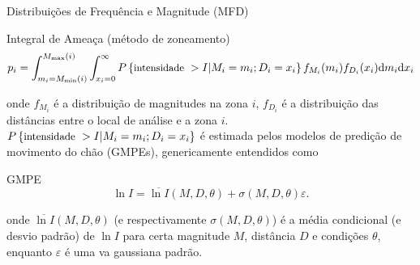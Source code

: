 \documentclass[ucs,8pt]{beamer}
\begin{document}
\begin{frame}{Distribuições de Frequência e Magnitude (MFD)}
	\begin{block}{Integral de Ameaça (método de zoneamento)}
		\begin{equation} 
		p_i= \displaystyle \int_{m_i =M_{\min}(i)}^{M_{\max}(i)}
		\int_{x_i =0}^{\infty}  P \left\{ \mbox{\small intensidade \normalsize }>I| M_i = m_i; D_i = x_i \right\}f_{M_i}(m_i) f_{D_i}( x_i )
		\mathrm{d}m_i \mathrm{d}x_i
		\end{equation}
	\end{block}
	onde $f_{M_i}$ é a distribuição de magnitudes na zona $i$, 
	 $f_{D_i}$ é a distribuição das distâncias entre o local de análise e a zona
	 $i$. $P \left\{ \mbox{\small intensidade \normalsize }>I| M_i = m_i; D_i = x_i
	\right\}$ é estimada pelos modelos de predição de movimento do chão (GMPEs),
	genericamente entendidos como
	
	\begin{block}{GMPE}
		\begin{equation} \label{pgamodel}
		\ln I = \overline{\ln I}(M, D, \theta) + \sigma(M, D, \theta) \varepsilon.
		\end{equation}
	\end{block}
	onde $\overline{\ln I}(M, D, \theta)$ (e respectivamente $\sigma(M, D,
	\theta)$) é a média condicional (e desvio padrão) de $\ln I$ para certa magnitude $M$, distância $D$
	e condições $\theta$, enquanto $\varepsilon$ é uma \gls{va} gaussiana padrão.
\end{frame}






\end{document}
